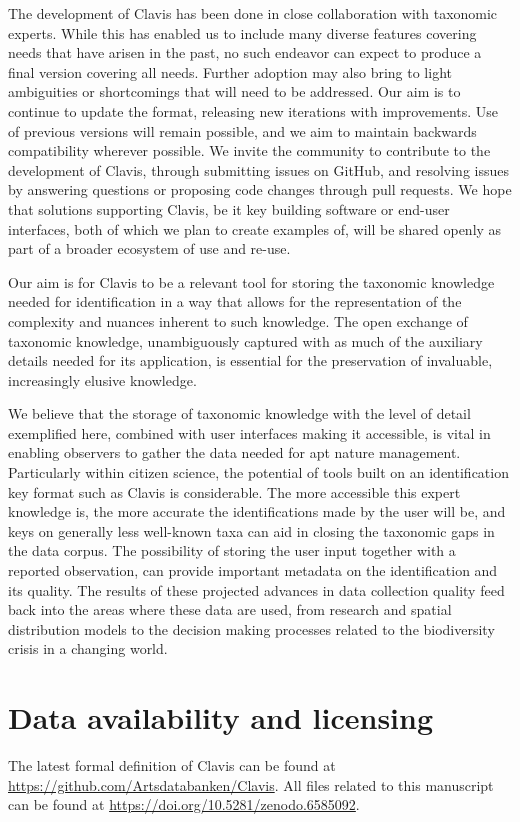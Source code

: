 \documentclass[10pt,letterpaper]{article}
\begin{document}
The development of Clavis has been done in close collaboration with taxonomic experts. While this has enabled us to include many diverse features covering needs that have arisen in the past, no such endeavor can expect to produce a final version covering all needs. Further adoption may also bring to light ambiguities or shortcomings that will need to be addressed. Our aim is to continue to update the format, releasing new iterations with improvements. Use of previous versions will remain possible, and we aim to maintain backwards compatibility wherever possible. We invite the community to contribute to the development of Clavis, through submitting issues on GitHub, and resolving issues by answering questions or proposing code changes through pull requests. We hope that solutions supporting Clavis, be it key building software or end-user interfaces, both of which we plan to create examples of, will be shared openly as part of a broader ecosystem of use and re-use.

Our aim is for Clavis to be a relevant tool for storing the taxonomic knowledge needed for identification in a way that allows for the representation of the complexity and nuances inherent to such knowledge. The open exchange of taxonomic knowledge, unambiguously captured with as much of the auxiliary details needed for its application, is essential for the preservation of invaluable, increasingly elusive knowledge.

We believe that the storage of taxonomic knowledge with the level of detail exemplified here, combined with user interfaces making it accessible, is vital in enabling observers to gather the data needed for apt nature management. Particularly within citizen science, the potential of tools built on an identification key format such as Clavis is considerable. The more accessible this expert knowledge is, the more accurate the identifications made by the user will be, and keys on generally less well-known taxa can aid in closing the taxonomic gaps in the data corpus. The possibility of storing the user input together with a reported observation, can provide important metadata on the identification and its quality. The results of these projected advances in data collection quality feed back into the areas where these data are used, from research and spatial distribution models to the decision making processes related to the biodiversity crisis in a changing world.

\section*{
Data availability and licensing
}
The latest formal definition of Clavis can be found at \url{https://github.com/Artsdatabanken/Clavis}. All files related to this manuscript can be found at \url{https://doi.org/10.5281/zenodo.6585092}.
\end{document}
